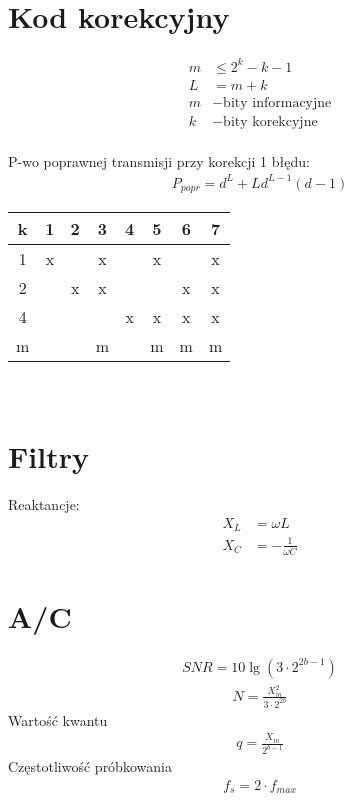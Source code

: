 \documentclass[10pt,twocolumn,a4paper,fleqn]{article}
\begin{document}
\section{Kod korekcyjny}
\begin{align*}
	m &\le 2^k-k-1 \\
	L & = m+k \\
	m & - \text{bity informacyjne}\\
	k & - \text{bity korekcyjne}\\
\end{align*}

P-wo poprawnej transmisji przy korekcji 1 błędu:
\begin{align*}
	P_{popr} = d^L + Ld^{L-1}(d-1)
\end{align*}

\begin{tabular}{|c|c|c|c|c|c|c|c|}
\hline
k & 1 & 2 & 3 & 4 & 5 & 6 & 7 \\\hline
1 & x &   & x &   & x &   & x \\\hline
2 &   & x & x &   &   & x & x \\\hline
4 &   &   &   & x & x & x & x \\\hline
m &   &   & m &   & m & m & m \\\hline
\end{tabular}\\

\section{Filtry} 
Reaktancje:
\begin{align*}
	X_L & = \omega L\\
	X_C & = - \frac{1}{\omega C}
\end{align*}

\section{A/C} 
\begin{align*}
	SNR = 10 \lg(3\cdot2^{2b-1})
\end{align*}
\begin{align*}
	N = \frac{X_m^2}{3\cdot2^{2b}}
\end{align*}
Wartość kwantu
\begin{align*}
	q = \frac{X_m}{2^{b-1}}
\end{align*}
Częstotliwość próbkowania
\begin{align*}
	f_s = 2 \cdot f_{max}
\end{align*}
\end{document}
